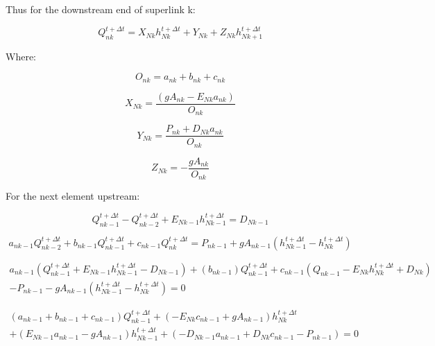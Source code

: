 \documentclass[11pt]{article}
\begin{document}
Thus for the downstream end of superlink k:

\begin{equation}
  \boxed{
  Q_{nk}^{t + \Delta t} = X_{Nk} h_{Nk}^{t + \Delta t} + Y_{Nk} + Z_{Nk} h_{Nk + 1}^{t + \Delta t}
  }
\end{equation}

Where:

\begin{equation}
  \boxed{
  O_{nk} = a_{nk} + b_{nk} + c_{nk}
  }
\end{equation}

\begin{equation}
  \boxed{
  X_{Nk} = \frac{( g A_{nk} - E_{Nk} a_{nk} )}{O_{nk}}
  }
\end{equation}

\begin{equation}
  \boxed{
  Y_{Nk} = \frac{P_{nk} +  D_{Nk} a_{nk}}{O_{nk}}
  } 
\end{equation}

\begin{equation}
  \boxed{
  Z_{Nk} = - \frac{g A_{nk}}{O_{nk}}
  } 
\end{equation}

For the next element upstream:

\begin{equation}
  Q_{nk - 1}^{t + \Delta t} - Q_{nk - 2}^{t + \Delta t} + E_{Nk - 1} h_{Nk - 1}^{t + \Delta t} = D_{Nk - 1}
\end{equation}


\begin{equation}
   a_{nk - 1} Q_{nk - 2}^{t + \Delta t} + b_{nk - 1} Q_{nk - 1}^{t + \Delta t} + c_{nk - 1} Q_{nk}^{t + \Delta t} = P_{nk - 1} + g A_{nk - 1} (h_{Nk - 1}^{t + \Delta t} - h_{Nk}^{t + \Delta t})
\end{equation}

\begin{equation}
  \begin{split}
    a_{nk - 1} (Q_{nk - 1}^{t + \Delta t} + E_{Nk - 1} h_{Nk - 1}^{t + \Delta t}
    - D_{Nk - 1}) + (b_{nk - 1}) Q_{nk - 1}^{t + \Delta t} + c_{nk - 1} (Q_{nk -
      1} - E_{Nk} h_{Nk}^{t + \Delta t} + D_{Nk}) \\ - P_{nk - 1} - g A_{nk - 1}
    (h_{Nk - 1}^{t + \Delta t} - h_{Nk}^{t + \Delta t}) = 0
  \end{split}
\end{equation}

\begin{equation}
  \begin{split}
    (a_{nk - 1} + b_{nk - 1} + c_{nk - 1})  Q_{nk - 1}^{t + \Delta t} + ( - E_{Nk} c_{nk - 1} + g A_{nk - 1}) h_{Nk}^{t + \Delta t} \\ + (E_{Nk - 1} a_{nk - 1} - g A_{nk -1}) h_{Nk - 1}^{t + \Delta t}   
    + (- D_{Nk - 1} a_{nk - 1}   + D_{Nk} c_{nk - 1} - P_{nk - 1}) = 0 
  \end{split}
\end{equation}
\end{document}
